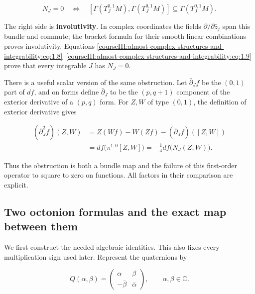 \begin{equation}
N_J=0\quad\Longleftrightarrow\quad
[\Gamma(T^{0,1}_JM),\Gamma(T^{0,1}_JM)]
\subseteq\Gamma(T^{0,1}_JM).
\label{courseIII:almost-complex-structures-and-integrability:eq:1.9}
\end{equation}

The right side is \textbf{involutivity}. In complex coordinates the fields \(\partial/\partial\bar z_j\) span this bundle and commute; the bracket formula for their smooth linear combinations proves involutivity. Equations \eqref{courseIII:almost-complex-structures-and-integrability:eq:1.8}--\eqref{courseIII:almost-complex-structures-and-integrability:eq:1.9} prove that every integrable \(J\) has \(N_J=0\).

There is a useful scalar version of the same obstruction. Let \(\bar\partial_J f\) be the \((0,1)\) part of \(df\), and on forms define \(\bar\partial_J\) to be the \((p,q+1)\) component of the exterior derivative of a \((p,q)\) form. For \(Z,W\) of type \((0,1)\), the definition of exterior derivative gives

\begin{equation}
\begin{aligned}
(\bar\partial_J^2f)(Z,W)
&=Z(Wf)-W(Zf)-(\bar\partial_Jf)([Z,W])\\
&=df\bigl(\pi^{1,0}[Z,W]\bigr)
=-\tfrac14df\bigl(N_J(Z,W)\bigr).
\end{aligned}
\label{courseIII:almost-complex-structures-and-integrability:eq:1.10}
\end{equation}

Thus the obstruction is both a bundle map and the failure of this first-order operator to square to zero on functions. All factors in their comparison are explicit.

\subsection{Two octonion formulas and the exact map between them}
\label{courseIII:almost-complex-structures-and-integrability:octonion-comparison}

\label{courseIII:almost-complex-structures-and-integrability:section-2}

We first construct the needed algebraic identities. This also fixes every multiplication sign used later. Represent the quaternions by

\begin{equation}
Q(\alpha,\beta)=
\begin{pmatrix}\alpha&\beta\\-\bar\beta&\bar\alpha\end{pmatrix},
\qquad \alpha,\beta\in\mathbb C.
\label{courseIII:almost-complex-structures-and-integrability:eq:2.1}
\end{equation}

